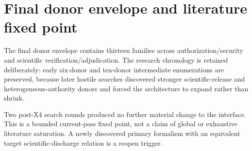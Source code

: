 \section{Final donor envelope and literature fixed point}

The final donor envelope contains thirteen families across authorization/security and scientific verification/adjudication. The research chronology is retained deliberately: early six-donor and ten-donor intermediate enumerations are preserved, because later hostile searches discovered stronger scientific-release and heterogeneous-authority donors and forced the architecture to expand rather than shrink.

Two post-X4 search rounds produced no further material change to the interface. This is a bounded current-pass fixed point, not a claim of global or exhaustive literature saturation. A newly discovered primary formalism with an equivalent target scientific-discharge relation is a reopen trigger.
